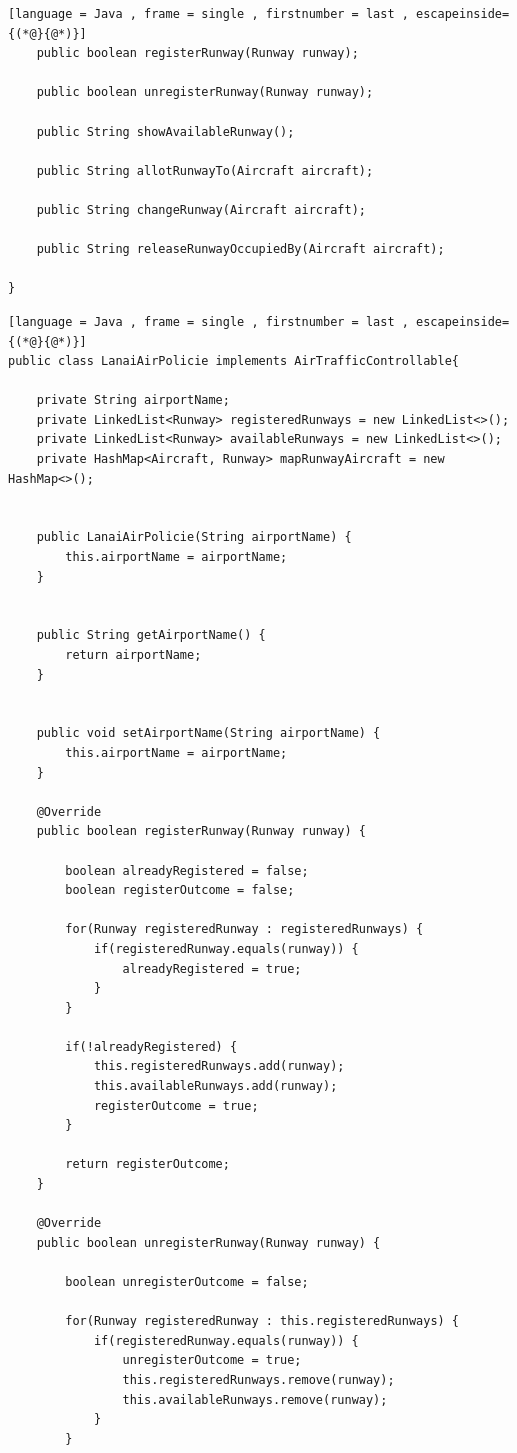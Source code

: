 \documentclass{article}
\begin{document}
\begin{sloppy}
\begin{lstlisting}[language = Java , frame = single , firstnumber = last , escapeinside={(*@}{@*)}]
	public boolean registerRunway(Runway runway);
	
	public boolean unregisterRunway(Runway runway);
	
	public String showAvailableRunway();
	
	public String allotRunwayTo(Aircraft aircraft);
	
	public String changeRunway(Aircraft aircraft);
	
	public String releaseRunwayOccupiedBy(Aircraft aircraft);
	
}

\end{lstlisting}

\begin{lstlisting}[language = Java , frame = single , firstnumber = last , escapeinside={(*@}{@*)}]
public class LanaiAirPolicie implements AirTrafficControllable{

	private String airportName;
	private LinkedList<Runway> registeredRunways = new LinkedList<>();
	private LinkedList<Runway> availableRunways = new LinkedList<>();
	private HashMap<Aircraft, Runway> mapRunwayAircraft = new HashMap<>();
	
	
	public LanaiAirPolicie(String airportName) {
		this.airportName = airportName;
	}
	
	
	public String getAirportName() {
		return airportName;
	}


	public void setAirportName(String airportName) {
		this.airportName = airportName;
	}

	@Override
	public boolean registerRunway(Runway runway) {
		
		boolean alreadyRegistered = false;
		boolean registerOutcome = false;
		
		for(Runway registeredRunway : registeredRunways) {
			if(registeredRunway.equals(runway)) {
				alreadyRegistered = true;
			}
		}
		
		if(!alreadyRegistered) {
			this.registeredRunways.add(runway);
			this.availableRunways.add(runway);
			registerOutcome = true;
		}
		
		return registerOutcome;
	}

	@Override
	public boolean unregisterRunway(Runway runway) {
		
		boolean unregisterOutcome = false;
		
		for(Runway registeredRunway : this.registeredRunways) {
			if(registeredRunway.equals(runway)) {
				unregisterOutcome = true;
				this.registeredRunways.remove(runway);
				this.availableRunways.remove(runway);
			}
		}
		

\end{lstlisting}
\end{sloppy}
\end{document}
